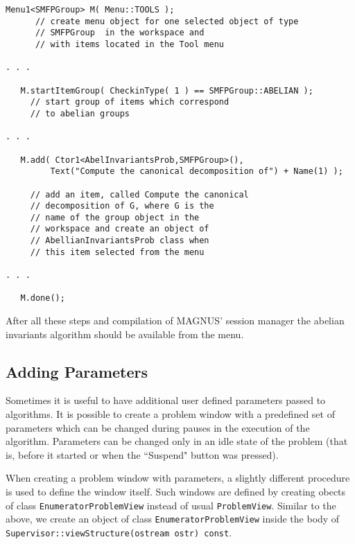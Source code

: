 \documentclass[12pt]{article}
\def\nsmagnus{MAGNUS}
\begin{document}
\footnotesize
\begin{verbatim}
Menu1<SMFPGroup> M( Menu::TOOLS );
      // create menu object for one selected object of type
      // SMFPGroup  in the workspace and
      // with items located in the Tool menu

. . .

   M.startItemGroup( CheckinType( 1 ) == SMFPGroup::ABELIAN );
     // start group of items which correspond
     // to abelian groups

. . .

   M.add( Ctor1<AbelInvariantsProb,SMFPGroup>(),
         Text("Compute the canonical decomposition of") + Name(1) );

     // add an item, called Compute the canonical
     // decomposition of G, where G is the
     // name of the group object in the
     // workspace and create an object of
     // AbellianInvariantsProb class when
     // this item selected from the menu

. . .

   M.done();
\end{verbatim}
\normalsize

After all these steps and compilation of \nsmagnus' session manager
the abelian invariants algorithm should be available from the menu.




\subsection{Adding Parameters}

Sometimes it is useful to have additional user defined parameters
passed to algorithms. It is possible to create a problem window
with  a predefined set of parameters which can be changed during
pauses in the execution of the algorithm. 
Parameters can be changed only in
an idle state of the problem (that is, before it started or when the
``Suspend" button  was pressed).

When creating a problem window with parameters, a slightly different
procedure is used to define the window itself. 
Such windows are defined by creating
obects of class {\tt EnumeratorProblemView} instead of usual
{\tt ProblemView}.
Similar to the above, we create an object of
class {\tt EnumeratorProblemView} inside the body of
{\tt Supervisor::viewStructure(ostream ostr) const}. 
\end{document}
